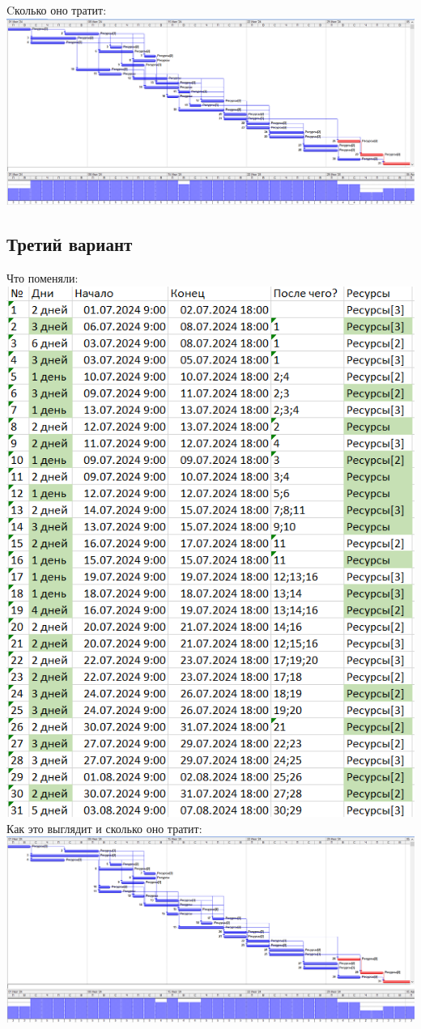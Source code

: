 \documentclass[14pt]{article}
\begin{document}
		{\LARGE Cколько оно тратит:}\\
		\includegraphics[width=\textwidth]{../img/1b2_answer.png}\\ 
	\subsection{Третий вариант}
		{\LARGE Что поменяли:}\\
		\includegraphics[height=0.6\textheight]{../img/1b3_days_change.png}\\ 
		{\LARGE Как это выглядит и сколько оно тратит:}\\
		\includegraphics[width=\textwidth]{../img/1b3_answer.png}\\ 
\end{document}
